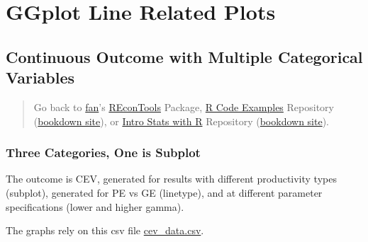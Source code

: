 \documentclass[
]{book}
\begin{document}
\hypertarget{ggplot-line-related-plots}{%
\section{GGplot Line Related Plots}\label{ggplot-line-related-plots}}

\hypertarget{continuous-outcome-with-multiple-categorical-variables}{%
\subsection{Continuous Outcome with Multiple Categorical Variables}\label{continuous-outcome-with-multiple-categorical-variables}}

\begin{quote}
Go back to \href{http://fanwangecon.github.io/}{fan}'s \href{https://fanwangecon.github.io/REconTools/}{REconTools} Package, \href{https://fanwangecon.github.io/R4Econ/}{R Code Examples} Repository (\href{https://fanwangecon.github.io/R4Econ/bookdown}{bookdown site}), or \href{https://fanwangecon.github.io/Stat4Econ/}{Intro Stats with R} Repository (\href{https://fanwangecon.github.io/Stat4Econ/bookdown}{bookdown site}).
\end{quote}

\hypertarget{three-categories-one-is-subplot}{%
\subsubsection{Three Categories, One is Subplot}\label{three-categories-one-is-subplot}}

The outcome is CEV, generated for results with different productivity types (subplot), generated for PE vs GE (linetype), and at different parameter specifications (lower and higher gamma).

The graphs rely on this csv file \href{https://github.com/FanWangEcon/R4Econ/tree/master/tabgraph/ggline/_file}{cev\_data.csv}.
\end{document}
